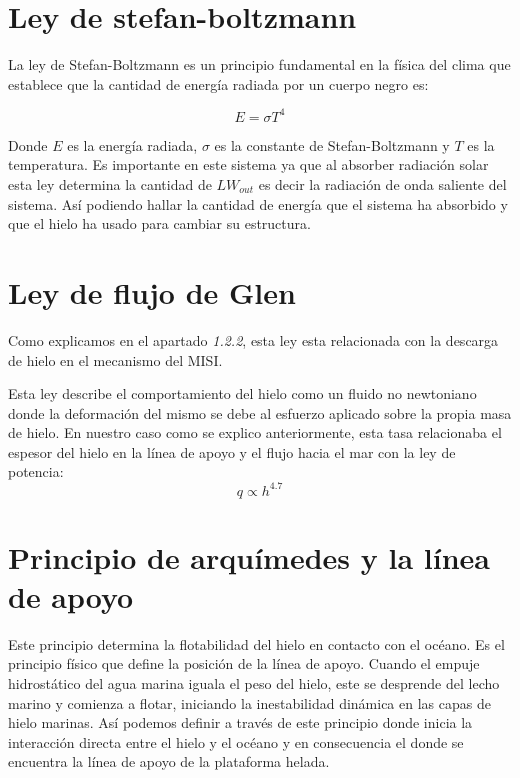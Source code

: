 \documentclass[12pt,a4paper,chapterprefix=false,headings=twolinechapter]{scrreprt}
\begin{document}
\section{Ley de stefan-boltzmann}
La ley de Stefan-Boltzmann es un principio fundamental en la física del clima que establece que la cantidad de energía radiada por un cuerpo negro es:

\begin{equation}
    E = \sigma T^4
\end{equation}

Donde $E$ es la energía radiada, $\sigma$ es la constante de Stefan-Boltzmann y $T$ es la temperatura. Es importante en este sistema ya que al absorber radiación solar esta ley determina la cantidad de
\textit{$LW_{out}$} es decir la radiación de onda saliente del sistema. Así podiendo hallar la cantidad de energía que el sistema ha absorbido y que el hielo ha usado para cambiar su estructura.

\section{Ley de flujo de Glen}
Como explicamos en el apartado \textit{1.2.2}, esta ley esta relacionada con la descarga de hielo en el mecanismo del MISI. 

\vspace{0.5cm}

Esta ley describe el comportamiento del hielo como un fluido no newtoniano donde la deformación del mismo se debe al esfuerzo aplicado sobre la propia masa de hielo. En nuestro caso como se explico 
anteriormente, esta tasa relacionaba el espesor del hielo en la línea de apoyo y el flujo hacia el mar con la ley de potencia:
\begin{equation}
    q \propto h^{4.7}
\end{equation}

\vspace{0.5cm}

\section{Principio de arquímedes y la línea de apoyo}

Este principio determina la flotabilidad del hielo en contacto con el océano. Es el principio físico que define la posición de la línea de apoyo. Cuando el empuje hidrostático del agua marina iguala 
el peso del hielo, este se desprende del lecho marino y comienza a flotar, iniciando la inestabilidad dinámica en las capas de hielo marinas. Así podemos definir a través de este principio donde inicia 
la interacción directa entre el hielo y el océano y en consecuencia el donde se encuentra la línea de apoyo de la plataforma helada. 
\end{document}

